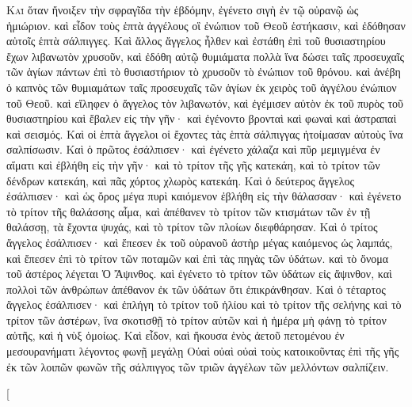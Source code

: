 \begin{pages}
    \begin{Rightside}
        \beginnumbering
		\renewcommand{\LettrineFontHook}{\PHtitl}
		\lettrine[lines=3]{Κ}{αὶ} ὅταν ἤνοιξεν τὴν σφραγῖδα τὴν ἑβδόμην, ἐγένετο σιγὴ ἐν τῷ οὐρανῷ ὡς ἡμιώριον. καὶ εἶδον τοὺς ἑπτὰ ἀγγέλους οἳ ἐνώπιον τοῦ Θεοῦ ἑστήκασιν, καὶ ἐδόθησαν αὐτοῖς ἑπτὰ σάλπιγγες. Καὶ ἄλλος ἄγγελος ἦλθεν καὶ ἐστάθη ἐπὶ τοῦ θυσιαστηρίου ἔχων λιβανωτὸν χρυσοῦν, καὶ ἐδόθη αὐτῷ θυμιάματα πολλὰ ἵνα δώσει ταῖς προσευχαῖς τῶν ἁγίων πάντων ἐπὶ τὸ θυσιαστήριον τὸ χρυσοῦν τὸ ἐνώπιον τοῦ θρόνου. 
		\pend
		\pstart
		καὶ ἀνέβη ὁ καπνὸς τῶν θυμιαμάτων ταῖς προσευχαῖς τῶν ἁγίων ἐκ χειρὸς τοῦ ἀγγέλου ἐνώπιον τοῦ Θεοῦ. καὶ εἴληφεν ὁ ἄγγελος τὸν λιβανωτόν, καὶ ἐγέμισεν αὐτὸν ἐκ τοῦ πυρὸς τοῦ θυσιαστηρίου καὶ ἔβαλεν εἰς τὴν γῆν· καὶ ἐγένοντο βρονταὶ καὶ φωναὶ καὶ ἀστραπαὶ καὶ σεισμός. Καὶ οἱ ἑπτὰ ἄγγελοι οἱ ἔχοντες τὰς ἑπτὰ σάλπιγγας ἡτοίμασαν αὑτοὺς ἵνα σαλπίσωσιν.
		\pend
		\pstart
		Καὶ ὁ πρῶτος ἐσάλπισεν· καὶ ἐγένετο χάλαζα καὶ πῦρ μεμιγμένα ἐν αἵματι καὶ ἐβλήθη εἰς τὴν γῆν· καὶ τὸ τρίτον τῆς γῆς κατεκάη, καὶ τὸ τρίτον τῶν δένδρων κατεκάη, καὶ πᾶς χόρτος χλωρὸς κατεκάη. 
		\pend
		\pstart
		Καὶ ὁ δεύτερος ἄγγελος ἐσάλπισεν· καὶ ὡς ὄρος μέγα πυρὶ καιόμενον ἐβλήθη εἰς τὴν θάλασσαν· καὶ ἐγένετο τὸ τρίτον τῆς θαλάσσης αἷμα, καὶ ἀπέθανεν τὸ τρίτον τῶν κτισμάτων τῶν ἐν τῇ θαλάσσῃ, τὰ ἔχοντα ψυχάς, καὶ τὸ τρίτον τῶν πλοίων διεφθάρησαν. 
		\pend
		\pstart
		Καὶ ὁ τρίτος ἄγγελος ἐσάλπισεν· καὶ ἔπεσεν ἐκ τοῦ οὐρανοῦ ἀστὴρ μέγας καιόμενος ὡς λαμπάς, καὶ ἔπεσεν ἐπὶ τὸ τρίτον τῶν ποταμῶν καὶ ἐπὶ τὰς πηγὰς τῶν ὑδάτων. καὶ τὸ ὄνομα τοῦ ἀστέρος λέγεται Ὁ Ἄψινθος. καὶ ἐγένετο τὸ τρίτον τῶν ὑδάτων εἰς ἄψινθον, καὶ πολλοὶ τῶν ἀνθρώπων ἀπέθανον ἐκ τῶν ὑδάτων ὅτι ἐπικράνθησαν. 
		\pend
		\pstart
		Καὶ ὁ τέταρτος ἄγγελος ἐσάλπισεν· καὶ ἐπλήγη τὸ τρίτον τοῦ ἡλίου καὶ τὸ τρίτον τῆς σελήνης καὶ τὸ τρίτον τῶν ἀστέρων, ἵνα σκοτισθῇ τὸ τρίτον αὐτῶν καὶ ἡ ἡμέρα μὴ φάνῃ τὸ τρίτον αὐτῆς, καὶ ἡ νὺξ ὁμοίως. Καὶ εἶδον, καὶ ἤκουσα ἑνὸς ἀετοῦ πετομένου ἐν μεσουρανήματι λέγοντος φωνῇ μεγάλῃ Οὐαὶ οὐαὶ οὐαὶ τοὺς κατοικοῦντας ἐπὶ τῆς γῆς ἐκ τῶν λοιπῶν φωνῶν τῆς σάλπιγγος τῶν τριῶν ἀγγέλων τῶν μελλόντων σαλπίζειν.
		\pend
        \endnumbering
    \end{Rightside}
    \begin{Leftside}
        \beginnumbering
        \pstart[

\end{Leftside}
\end{pages}
